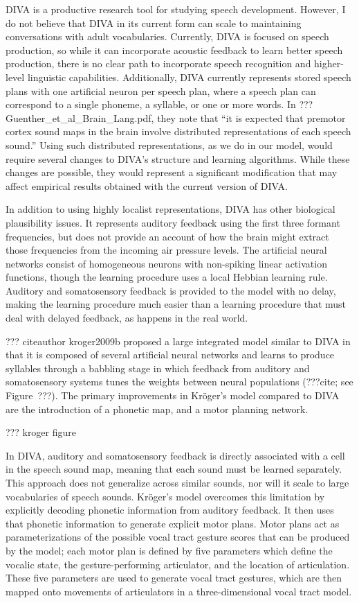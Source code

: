 DIVA is a productive research tool
for studying speech development.
However, I do not believe that DIVA
in its current form
can scale to maintaining conversations
with adult vocabularies.
Currently, DIVA is focused on speech production,
so while it can incorporate acoustic feedback
to learn better speech production,
there is no clear path
to incorporate speech recognition
and higher-level linguistic capabilities.
Additionally, DIVA currently represents
stored speech plans with one artificial
neuron per speech plan,
where a speech plan can correspond to
a single phoneme, a syllable, or one or more words.
In ??? Guenther_et_al_Brain_Lang.pdf,
they note that ``it is expected that
premotor cortex sound maps in the brain
involve distributed representations
of each speech sound.''
Using such distributed representations,
as we do in our model,
would require several changes to DIVA's
structure and learning algorithms.
While these changes are possible,
they would represent a significant
modification that may affect
empirical results obtained
with the current version of DIVA.

In addition to using highly localist representations,
DIVA has other biological plausibility issues.
It represents auditory feedback using the first
three formant frequencies,
but does not provide an account of
how the brain might extract those
frequencies from the incoming air pressure levels.
The artificial neural networks
consist of homogeneous neurons
with non-spiking linear activation functions,
though the learning procedure
uses a local Hebbian learning rule.
Auditory and somatosensory feedback
is provided to the model with no delay,
making the learning procedure
much easier than a learning procedure
that must deal with delayed feedback,
as happens in the real world.

??? citeauthor kroger2009b proposed
a large integrated model
similar to DIVA in that
it is composed of
several artificial neural networks
and learns to produce syllables
through a babbling stage
in which feedback from
auditory and somatosensory systems
tunes the weights between
neural populations
(???cite; see Figure~???).
The primary improvements in
Kr\"{o}ger's model compared to DIVA
are the introduction of a phonetic map,
and a motor planning network.

??? kroger figure

In DIVA, auditory and somatosensory feedback
is directly associated with a cell
in the speech sound map,
meaning that each sound must be learned separately.
This approach does not generalize across
similar sounds, nor will it scale
to large vocabularies of speech sounds.
Kr\"{o}ger's model overcomes this limitation
by explicitly decoding phonetic information
from auditory feedback.
It then uses that phonetic information
to generate explicit motor plans.
Motor plans act as parameterizations
of the possible vocal tract gesture scores
that can be produced by the model;
each motor plan is defined by
five parameters which define
the vocalic state,
the gesture-performing articulator,
and the location of articulation.
These five parameters are used
to generate vocal tract gestures,
which are then mapped onto
movements of articulators
in a three-dimensional vocal tract model.

